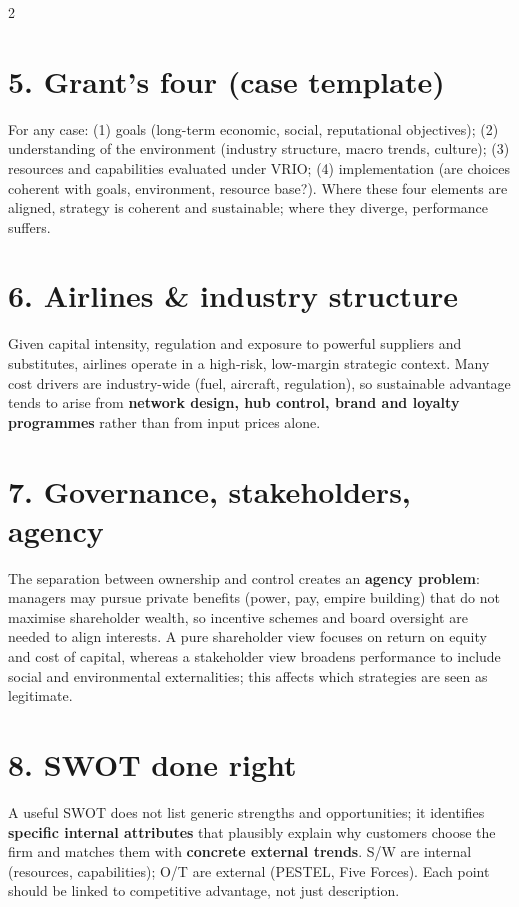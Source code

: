 \documentclass[8pt,landscape,a4paper]{article}
\begin{document}
\begin{multicols}{2}
\section*{\color{eublue}5. Grant's four (case template)}
For any case: (1) goals (long-term economic, social, reputational objectives); (2) understanding of the environment (industry structure, macro trends, culture); (3) resources and capabilities evaluated under VRIO; (4) implementation (are choices coherent with goals, environment, resource base?). Where these four elements are aligned, strategy is coherent and sustainable; where they diverge, performance suffers.

\section*{\color{eublue}6. Airlines \& industry structure}
Given capital intensity, regulation and exposure to powerful suppliers and substitutes, airlines operate in a high-risk, low-margin strategic context. Many cost drivers are industry-wide (fuel, aircraft, regulation), so sustainable advantage tends to arise from \textbf{network design, hub control, brand and loyalty programmes} rather than from input prices alone.

\section*{\color{eublue}7. Governance, stakeholders, agency}
The separation between ownership and control creates an \textbf{agency problem}: managers may pursue private benefits (power, pay, empire building) that do not maximise shareholder wealth, so incentive schemes and board oversight are needed to align interests. A pure shareholder view focuses on return on equity and cost of capital, whereas a stakeholder view broadens performance to include social and environmental externalities; this affects which strategies are seen as legitimate.

\section*{\color{eublue}8. SWOT done right}
A useful SWOT does not list generic strengths and opportunities; it identifies \textbf{specific internal attributes} that plausibly explain why customers choose the firm and matches them with \textbf{concrete external trends}. S/W are internal (resources, capabilities); O/T are external (PESTEL, Five Forces). Each point should be linked to competitive advantage, not just description.


\end{multicols}
\end{document}
